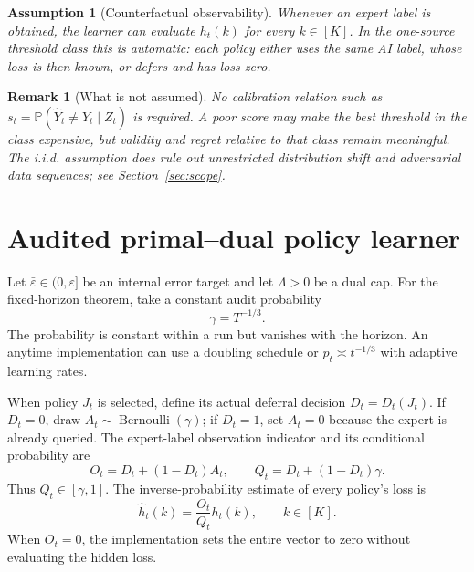 \documentclass[11pt]{article}
\newtheorem{assumption}{Assumption}
\newtheorem{remark}{Remark}
\newcommand{\Pp}{\mathbb{P}}
\newcommand{\eps}{\varepsilon}
\DeclareMathOperator{\Ber}{Bernoulli}
\begin{document}
\begin{assumption}[Counterfactual observability]
\label{ass:observability}
Whenever an expert label is obtained, the learner can evaluate $h_t(k)$ for
every $k\in[K]$.  In the one-source threshold class this is automatic: each
policy either uses the same AI label, whose loss is then known, or defers and
has loss zero.
\end{assumption}

\begin{remark}[What is not assumed]
No calibration relation such as $s_t=\Pp(\widehat Y_t\ne Y_t\mid Z_t)$ is
required.  A poor score may make the best threshold in the class expensive,
but validity and regret relative to that class remain meaningful.  The i.i.d.
assumption does rule out unrestricted distribution shift and adversarial data
sequences; see Section~\ref{sec:scope}.
\end{remark}

\section{Audited primal--dual policy learner}

Let $\bar\eps\in(0,\eps]$ be an internal error target and let
$\Lambda>0$ be a dual cap.  For the fixed-horizon theorem, take a constant
audit probability
\begin{equation}
  \gamma=T^{-1/3}.
  \label{eq:gamma-choice}
\end{equation}
The probability is constant within a run but vanishes with the horizon.  An
anytime implementation can use a doubling schedule or $p_t\asymp t^{-1/3}$
with adaptive learning rates.

When policy $J_t$ is selected, define its actual deferral decision
$D_t=D_t(J_t)$.  If $D_t=0$, draw $A_t\sim\Ber(\gamma)$; if $D_t=1$, set
$A_t=0$ because the expert is already queried.  The expert-label observation
indicator and its conditional probability are
\begin{equation}
  O_t=D_t+(1-D_t)A_t,
  \qquad
  Q_t=D_t+(1-D_t)\gamma.
  \label{eq:observation-mask}
\end{equation}
Thus $Q_t\in[\gamma,1]$.  The inverse-probability estimate of every policy's
loss is
\begin{equation}
  \widehat h_t(k)
  =
  \frac{O_t}{Q_t}h_t(k),
  \qquad k\in[K].
  \label{eq:ipw-vector}
\end{equation}
When $O_t=0$, the implementation sets the entire vector to zero without
evaluating the hidden loss.
\end{document}
